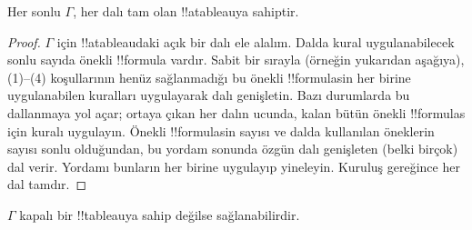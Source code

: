 \documentclass[../../../include/open-logic-section]{subfiles}
\begin{document}
\begin{prop}
  Her sonlu $\Gamma$, her dalı tam olan !!a{tableau}{}ya sahiptir.
\end{prop}

\begin{proof}
  $\Gamma$ için !!a{tableau}{}daki açık bir dalı ele alalım. Dalda kural
  uygulanabilecek sonlu sayıda önekli !!{formula} vardır. Sabit bir sırayla
  (örneğin yukarıdan aşağıya), (1)--(4) koşullarının henüz sağlanmadığı bu
  önekli !!{formula}s{}in her birine uygulanabilen kuralları uygulayarak dalı
  genişletin. Bazı durumlarda bu dallanmaya yol açar; ortaya çıkan her dalın
  ucunda, kalan bütün önekli !!{formula}s için kuralı uygulayın. Önekli
  !!{formula}s{}in sayısı ve dalda kullanılan öneklerin sayısı sonlu olduğundan,
  bu yordam sonunda özgün dalı genişleten (belki birçok) dal verir. Yordamı
  bunların her birine uygulayıp yineleyin. Kuruluş gereğince her dal tamdır.
\end{proof}

\begin{thm}[Tamlık]
  $\Gamma$ kapalı bir !!{tableau}{}ya sahip değilse sağlanabilirdir.
\end{thm}
\end{document}
